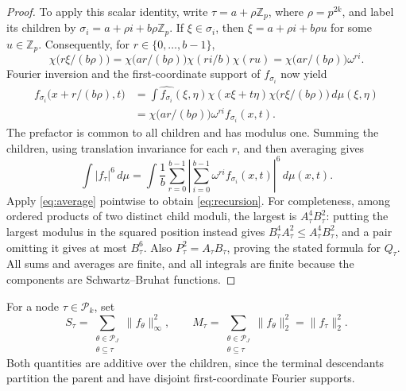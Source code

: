 \documentclass[11pt,twoside,a4paper]{article}
\numberwithin{equation}{section}
\theoremstyle{definition}
\newcommand{\Z}{\mathbb Z_p}
\newcommand{\cP}{\mathcal P}
\begin{document}
\begin{proof}
To apply this scalar identity, write $\tau=a+\rho\Z$, where $\rho=p^{2k}$, and label its children by $\sigma_i=a+\rho i+b\rho\Z$. If $\xi\in\sigma_i$, then $\xi=a+\rho i+b\rho u$ for some $u\in\Z$. Consequently, for $r\in\{0,\ldots,b-1\}$,
$$
\chi\bigl(r\xi/(b\rho)\bigr)
=\chi\bigl(ar/(b\rho)\bigr)\chi(ri/b)\chi(ru)
=\chi\bigl(ar/(b\rho)\bigr)\omega^{ri}.
$$
Fourier inversion and the first-coordinate support of $f_{\sigma_i}$ now yield
$$
\begin{aligned}
f_{\sigma_i}\bigl(x+r/(b\rho),t\bigr)
&=\int\widehat{f_{\sigma_i}}(\xi,\eta)
\chi(x\xi+t\eta)\chi\bigl(r\xi/(b\rho)\bigr)\,d\mu(\xi,\eta)\\
&=\chi\bigl(ar/(b\rho)\bigr)\omega^{ri}f_{\sigma_i}(x,t).
\end{aligned}
$$
The prefactor is common to all children and has modulus one. Summing the children, using translation invariance for each $r$, and then averaging gives
$$
\int|f_\tau|^6\,d\mu
=\int\frac1b\sum_{r=0}^{b-1}
\left|\sum_{i=0}^{b-1}\omega^{ri}f_{\sigma_i}(x,t)\right|^6\,d\mu(x,t).
$$
Apply \eqref{eq:average} pointwise to obtain \eqref{eq:recursion}. For completeness, among ordered products of two distinct child moduli, the largest is $A_\tau^4B_\tau^2$: putting the largest modulus in the squared position instead gives $B_\tau^4A_\tau^2\le A_\tau^4B_\tau^2$, and a pair omitting it gives at most $B_\tau^6$. Also $P_\tau^2=A_\tau B_\tau$, proving the stated formula for $Q_\tau$. All sums and averages are finite, and all integrals are finite because the components are Schwartz--Bruhat functions.
\end{proof}

For a node $\tau\in\cP_k$, set
$$
S_\tau=\sum_{\substack{\theta\in\cP_J\\\theta\subseteq\tau}}\|f_\theta\|_\infty^2,
\qquad M_\tau=\sum_{\substack{\theta\in\cP_J\\\theta\subseteq\tau}}\|f_\theta\|_2^2=\|f_\tau\|_2^2.
$$
Both quantities are additive over the children, since the terminal descendants partition the parent and have disjoint first-coordinate Fourier supports.
\end{document}
